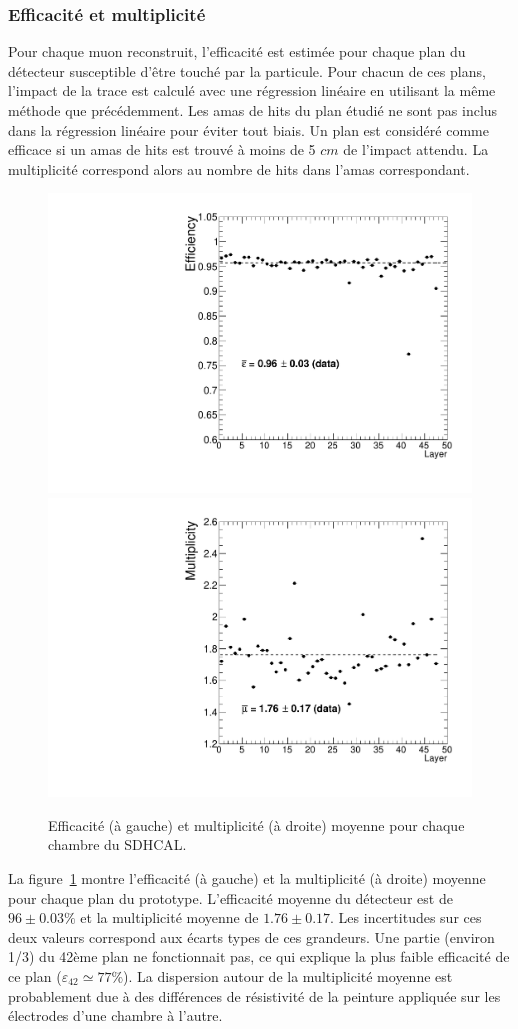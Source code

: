 \subsubsection{Efficacité et multiplicité}
Pour chaque muon reconstruit, l'efficacité est estimée pour chaque plan du détecteur susceptible d'être touché par la particule. Pour chacun de ces plans, l'impact de la trace est calculé avec une régression linéaire en utilisant la même méthode que précédemment. Les amas de hits du plan étudié ne sont pas inclus dans la régression linéaire pour éviter tout biais. Un plan est considéré comme efficace si un amas de hits est trouvé à moins de 5 $cm$ de l'impact attendu. La multiplicité correspond alors au nombre de hits dans l'amas correspondant. 
\begin{figure}[!ht]
  \begin{center}
    \includegraphics[width=.45\textwidth]{SDHCAL/figs/eff_2012.pdf}
    \includegraphics[width=.45\textwidth]{SDHCAL/figs/mul_2012.pdf}
    \caption{Efficacité (à gauche) et multiplicité (à droite) moyenne pour chaque chambre du SDHCAL.}
    \label{fig:eff_and_multi}
  \end{center}
\end{figure}
La figure~\ref{fig:eff_and_multi} montre l'efficacité (à gauche) et la multiplicité (à droite) moyenne pour chaque plan du prototype. L'efficacité moyenne du détecteur est de $96\pm0.03\%$ et la multiplicité moyenne de $1.76\pm0.17$. Les incertitudes sur ces deux valeurs correspond aux écarts types de ces grandeurs. Une partie (environ 1/3) du 42ème plan ne fonctionnait pas, ce qui explique la plus faible efficacité de ce plan ($\varepsilon_{42}\simeq77\%$). La dispersion autour de la multiplicité moyenne est probablement due à des différences de résistivité de la peinture appliquée sur les électrodes d'une chambre à l'autre.
